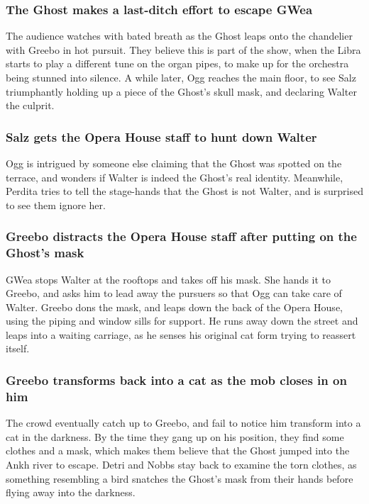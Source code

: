 \subsubsection{The \Gls{Ghost} makes a last-ditch effort to escape \Gls{GWea}}
The audience watches with bated breath as the \Gls{Ghost} leaps onto the chandelier with
\Gls{Greebo} in hot pursuit. They believe this is part of the show, when the \Gls{Libra} starts to 
play a different tune on the organ pipes, to make up for the orchestra being stunned into silence.
A while later, \Gls{Ogg} reaches the main floor, to see \Gls{Salz} triumphantly holding up a piece 
of the \Gls{Ghost}'s skull mask, and declaring \Gls{Walter} the culprit. 

\subsubsection{\Gls{Salz} gets the Opera House staff to hunt down \Gls{Walter}}
\Gls{Ogg} is intrigued by someone else claiming that the \Gls{Ghost} was spotted on the terrace, 
and wonders if \Gls{Walter} is indeed the \Gls{Ghost}'s real identity. Meanwhile, \Gls{Perdita}
tries to tell the stage-hands that the \Gls{Ghost} is not \Gls{Walter}, and is surprised to see 
them ignore her.

\subsubsection{\Gls{Greebo} distracts the Opera House staff after putting on the \Gls{Ghost}'s mask}
\Gls{GWea} stops \Gls{Walter} at the rooftops and takes off his mask. She hands it to \Gls{Greebo},
and asks him to lead away the pursuers so that \Gls{Ogg} can take care of \Gls{Walter}. \Gls{Greebo}
dons the mask, and leaps down the back of the Opera House, using the piping and window sills for 
support. He runs away down the street and leaps into a waiting carriage, as he senses his original 
cat form trying to reassert itself.

\subsubsection{\Gls{Greebo} transforms back into a cat as the mob closes in on him}
The crowd eventually catch up to \Gls{Greebo}, and fail to notice him transform into a cat in the 
darkness. By the time they gang up on his position, they find some clothes and a mask, which makes 
them believe that the \Gls{Ghost} jumped into the Ankh river to escape. \Gls{Detri} and \Gls{Nobbs}
stay back to examine the torn clothes, as something resembling a bird snatches the \Gls{Ghost}'s 
mask from their hands before flying away into the darkness. 

